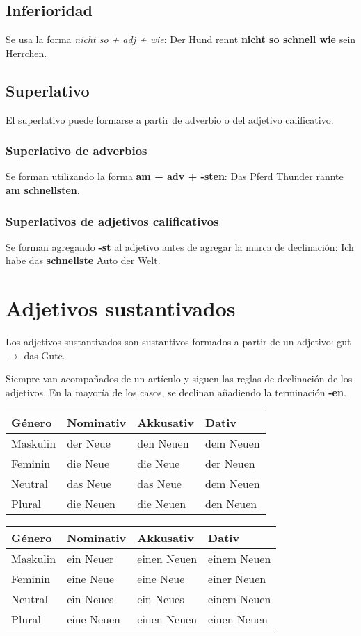 \subsection{Inferioridad}
Se usa la forma \textit{nicht so + adj + wie}: Der Hund rennt \textbf{nicht so schnell wie} sein Herrchen.

\subsection{Superlativo}
El superlativo puede formarse a partir de adverbio o del adjetivo calificativo.
\subsubsection{Superlativo de adverbios}
Se forman utilizando la forma \textbf{am + adv + -sten}: Das Pferd Thunder rannte \textbf{am schnellsten}.

\subsubsection{Superlativos de adjetivos calificativos}
Se forman agregando \textbf{-st} al adjetivo antes de agregar la marca de declinación: Ich habe das \textbf{schnellste} Auto der Welt.

\section{Adjetivos sustantivados}
Los adjetivos sustantivados son sustantivos formados a partir de un adjetivo: gut $\rightarrow$ das Gute.

Siempre van acompañados de un artículo y siguen las reglas de declinación de los adjetivos. En la mayoría de los casos, se declinan añadiendo la terminación \textbf{-en}.

\begin{tabular}{| l | l | l | l |}
\hline
\textbf{Género} & \textbf{Nominativ} & \textbf{Akkusativ} & \textbf{Dativ}\\
\hline
Maskulin & der Neue  & den Neuen & dem Neuen \\
Feminin  & die Neue  & die Neue  & der Neuen \\
Neutral  & das Neue  & das Neue  & dem Neuen \\
Plural   & die Neuen & die Neuen & den Neuen \\
\hline
\end{tabular}

\begin{tabular}{| l | l | l | l |}
\hline
\textbf{Género} & \textbf{Nominativ} & \textbf{Akkusativ} & \textbf{Dativ}\\
\hline
Maskulin & ein Neuer  &  einen Neuen & einem Neuen \\
Feminin  & eine Neue  &  eine Neue   & einer Neuen \\
Neutral  & ein Neues  &  ein Neues   & einem Neuen \\
Plural   & eine Neuen &  einen Neuen & einen Neuen \\
\hline
\end{tabular}

